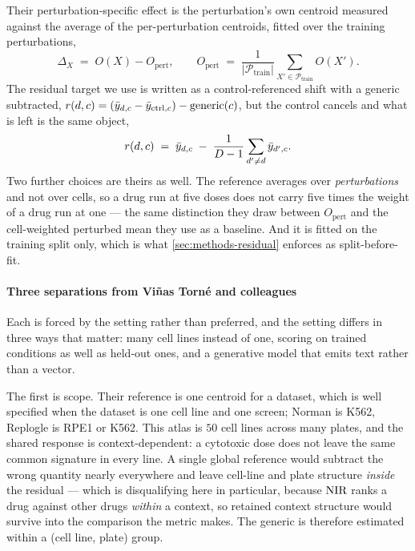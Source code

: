 Their perturbation-specific effect is
the perturbation's own centroid measured against the average of the
per-perturbation centroids, fitted over the training perturbations,
\begin{equation}
 \Delta_X \;=\; O(X) - O_{\textrm{pert}},
 \qquad
 O_{\textrm{pert}} \;=\; \frac{1}{|\mathcal{P}_{\textrm{train}}|}
   \sum_{X' \in \mathcal{P}_{\textrm{train}}} O(X') .
\end{equation}
The residual target we use is written as a control-referenced shift with a generic
subtracted, $r(d,c) = (\bar{y}_{d,c} - \bar{y}_{\textrm{ctrl},c}) -
\textrm{generic}(c)$, but the control cancels and what is left is the same
object,
\begin{equation}
 r(d,c) \;=\; \bar{y}_{d,c} \;-\; \frac{1}{D-1}\sum_{d' \neq d} \bar{y}_{d',c} .
\end{equation}
Two further choices are theirs as well. The reference averages over
\emph{perturbations} and not over cells, so a drug run at five doses does not
carry five times the weight of a drug run at one --- the same distinction they
draw between $O_{\textrm{pert}}$ and the cell-weighted perturbed mean they use as
a baseline. And it is fitted on the training split only, which is what
\cref{sec:methods-residual} enforces as split-before-fit.

\paragraph{Three separations from Vi\~nas Torn\'e and colleagues}
Each is forced by the
setting rather than preferred, and the setting differs in three ways that matter:
many cell lines instead of one, scoring on trained conditions as well as
held-out ones, and a generative model that emits text rather than a vector.

The first is scope. Their reference is one centroid for a dataset, which is
well specified when the dataset is one cell line and one screen; Norman is K562,
Replogle is RPE1 or K562. This atlas is $\num{50}$ cell lines across many plates,
and the shared response is context-dependent: a cytotoxic dose does not leave the
same common signature in every line. A single global reference would subtract the
wrong quantity nearly everywhere and leave cell-line and plate structure
\emph{inside} the residual --- which is disqualifying here in particular, because
$\textrm{NIR}$ ranks a drug against other drugs \emph{within} a context, so retained
context structure would survive into the comparison the metric makes. The generic
is therefore estimated within a (cell line, plate) group.

